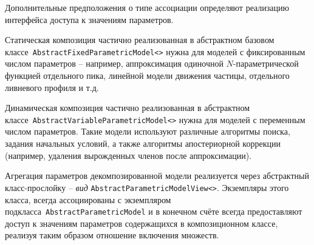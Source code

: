 Дополнительные предположения о типе ассоциации определяют реализацию интерфейса
доступа к значениям параметров.

Статическая композиция частично реализованная в абстрактном базовом
классе~\texttt{AbstractFixedParametricModel<>} нужна для моделей с
фиксированным числом параметров -- например, аппроксимация
одиночной $N$-параметрической функцией отдельного пика, линейной модели
движения частицы, отдельного ливневого профиля и т.д.

Динамическая композиция частично реализованная в абстрактном
классе~\texttt{AbstractVariableParametricModel<>} нужна для моделей с
переменным числом параметров. Такие модели используют различные алгоритмы
поиска, задания начальных условий, а также алгоритмы апостериорной
коррекции (например, удаления вырожденных членов после аппроксимации).

Агрегация параметров декомпозированной модели реализуется через абстрактный
класс-прослойку -- \emph{вид}
\texttt{AbstractParametricModelView<>}. Экземпляры этого класса,
всегда ассоциированы с экземпляром подкласса~\texttt{AbstractParametricModel}
и в конечном счёте всегда предоставляют доступ к значениям параметров
содержащихся в композиционном классе, реализуя таким образом отношение
включения множеств.